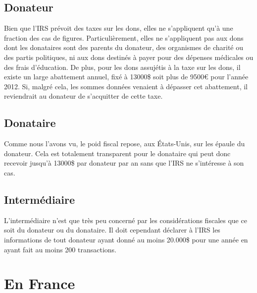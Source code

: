         \subsection{Donateur}
            Bien que l'IRS prévoit des taxes sur les dons, elles ne
            s'appliquent qu'à une fraction des cas de figures.
            Particulièrement, elles ne s'appliquent pas aux dons dont les
            donataires sont des parents du donateur, des organismes de
            charité ou des partis politiques, ni aux dons destinés à payer
            pour des dépenses médicales ou des frais d'éducation.
            De plus, pour les dons assujétis à la taxe sur les dons, il
            existe un large abattement annuel, fixé à 13000\$ soit plus
            de 9500\euro{} pour l'année 2012. Si, malgré cela, les sommes
            données venaient à dépasser cet abattement, il reviendrait au
            donateur de s'acquitter de cette taxe.
        \subsection{Donataire}
            Comme nous l'avons vu, le poid fiscal repose, aux États-Unis,
            sur les épaule du donateur. Cela est totalement transparent
            pour le donataire qui peut donc recevoir jusqu'à 13000\$
            par donateur par an sans que l'IRS ne s'intéresse à son cas.
        \subsection{Intermédiaire}
            L'intermédiaire n'est que très peu concerné par les
            considérations fiscales que ce soit du donateur ou du donataire.
            Il doit cependant déclarer à l'IRS les informations de
            tout donateur ayant donné au moins 20.000\$ pour une année en
            ayant fait au moins 200 transactions.
    \section{En France}
